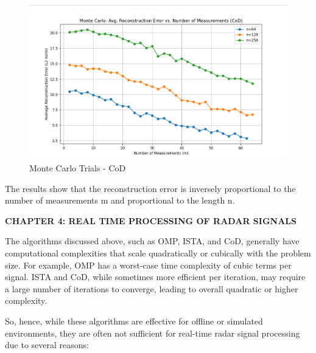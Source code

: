 \documentclass[
  letterpaper,
  DIV=11,
  numbers=noendperiod]{scrartcl}
\providecommand{\mainsection}[1]{\begin{center}{\rmfamily\textbf{\fontsize{14}{20}\selectfont #1}}\end{center}}
\begin{document}
\begin{figure}[H]

{\centering \includegraphics[width=0.8\linewidth,height=\textheight,keepaspectratio]{abar-cs_files/mediabag/montecarlo_CoD.png}

}

\caption{Monte Carlo Trials - CoD}

\end{figure}%

The results show that the reconstruction error is inversely proportional
to the number of measurements m and proportional to the length n.

\newpage

\mainsection{CHAPTER 4: REAL TIME PROCESSING OF RADAR SIGNALS}

The algorithms discussed above, such as OMP, ISTA, and CoD, generally
have computational complexities that scale quadratically or cubically
with the problem size. For example, OMP has a worst-case time complexity
of cubic terms per signal. ISTA and CoD, while sometimes more efficient
per iteration, may require a large number of iterations to converge,
leading to overall quadratic or higher complexity.

So, hence, while these algorithms are effective for offline or simulated
environments, they are often not sufficient for real-time radar signal
processing due to several reasons:
\end{document}
